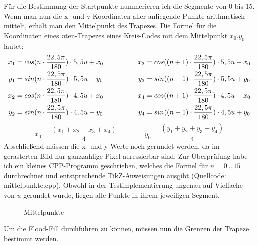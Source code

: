 	Für die Bestimmung der Startpunkte nummerieren ich die Segmente von 0 bis 15. Wenn man nun die x- und y-Koordinaten aller anliegende Punkte arithmetisch mittelt, erhält man den Mittelpunkt des Trapezes. Die Formel für die Koordinaten eines \textit{n}ten-Trapezes eines Kreis-Codes mit dem Mittelpunkt \(x_0 . y_0\) lautet:
\begin{gather}
	\begin{split}
		x_1 &= cos(n \cdot \frac{22,5\pi}{180}) \cdot 5,5u + x_0\\
		y_1 &= sin(n \cdot \frac{22,5\pi}{180}) \cdot 5,5u + y_0\\ \vspace{2em}
		x_2 &= cos(n \cdot \frac{22,5\pi}{180}) \cdot 4,5u + x_0\\
		y_2 &= sin(n \cdot \frac{22,5\pi}{180}) \cdot 4,5u + y_0
	\end{split}
	\hspace{5em}
	\begin{split}
		x_3 &= cos((n+1) \cdot \frac{22,5\pi}{180}) \cdot 5,5u + x_0\\
		y_3 &= sin((n+1) \cdot \frac{22,5\pi}{180}) \cdot 5,5u + y_0 \\ \vspace{2em}
		x_4 &= cos((n+1) \cdot \frac{22,5\pi}{180}) \cdot 4,5u + x_0\\
		y_4 &= sin((n+1) \cdot \frac{22,5\pi}{180}) \cdot 4,5u + y_0
	\end{split} \label{eq:nKoords}
\end{gather}
\begin{equation}
	x_0 = \frac{(x_1+x_2+x_3+x_4)}{4} \hspace{4em} y_0 = \frac{(y_1+y_2+y_3+y_4)}{4}
\end{equation}
	Abschließend müssen die x- und y-Werte noch gerundet werden, da im gerasterten Bild nur ganzzahlige Pixel adressierbar sind.
	Zur Überprüfung habe ich ein kleines CPP-Programm geschrieben, welches die Formel für \(n = 0\hspace{2pt}..\hspace{2pt}15 \) durchrechnet und entstprechende TikZ-Anweisungen ausgibt (Quellcode: mittelpunkte.cpp). Obwohl in der Testimplementierung ungenau auf Vielfache von \(u\) gerundet wurde, liegen alle Punkte in ihrem jeweiligen Segment.
	\begin{figure}[!ht]
		\centering
		
		\caption{Mittelpunkte}
	\end{figure}

	Um die Flood-Fill durchführen zu können, müssen nun die Grenzen der Trapeze bestimmt werden. 

